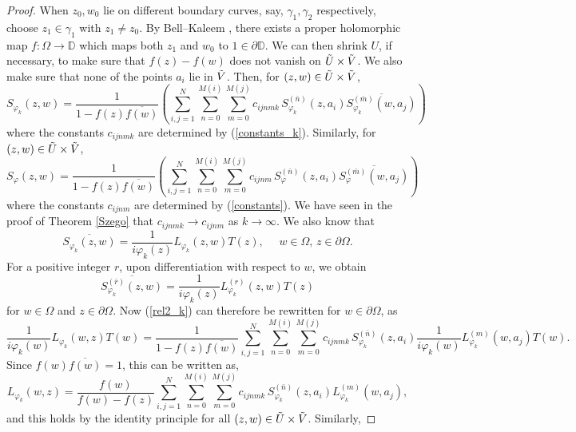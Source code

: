 \documentclass[11pt, reqno]{amsart}
\numberwithin{equation}{section}
\newcommand{\ra}{\rightarrow}
\newcommand{\Om}{\Omega}
\begin{document}
\begin{proof}
        When $z_0,w_0$ lie on different boundary curves, say, $\gamma_1, \gamma_2$ respectively, choose $z_1\in \gamma_1$ with $z_1\neq z_0$. By Bell--Kaleem \cite{BeKf}, there exists a proper holomorphic map $f: \Omega \ra \mathbb D$ which maps both $z_1$ and $w_0$ to $1 \in \partial \mathbb D$. We can then shrink $U$, if necessary, to make sure that $f(z)-f(w)$ does not vanish on $\Tilde{U}\times\Tilde{V}$. We also make sure that none of the points $a_i$ lie in $\Tilde{V}$. Then, for $(z,w)\in \Tilde{U}\times \Tilde{V}$, 
		\begin{equation}\label{rel2_k}
			S_{\varphi_k}(z,w) = \frac{1}{1-f(z)\overline{f(w)}} \left(\sum_{i,j=1}^N \sum_{n=0}^{M(i)} \sum_{m=0}^{M(j)} c_{ijnmk}\, S_{\varphi_k}^{(\bar{n})}(z,a_i) \overline{S_{\varphi_k}^{(\bar{m})}(w,a_j)}\right)
		\end{equation}
        where the constants $c_{ijnmk}$ are determined by (\ref{constants_k}). Similarly, for $(z,w)\in \Tilde{U}\times \Tilde{V}$, 
		\begin{equation}\label{rel2}
			S_{\varphi}(z,w) = \frac{1}{1-f(z)\overline{f(w)}} \left(\sum_{i,j=1}^N \sum_{n=0}^{M(i)} \sum_{m=0}^{M(j)} c_{ijnm}\, S_{\varphi}^{(\bar{n})}(z,a_i) \overline{S_{\varphi}^{(\bar{m})}(w,a_j)}\right)
		\end{equation}
        where the constants $c_{ijnm}$ are determined by (\ref{constants}).
        We have seen in the proof of Theorem \ref{Szego} that $c_{ijnmk}\rightarrow c_{ijnm}$ as $k\rightarrow\infty$. We also know that
	\[
	\overline{S_{\varphi_k}(z,w)} = \frac{1}{i\varphi_k(z)}L_{\varphi_k}(z,w)T(z),
	\quad\,\,
	w\in\Om, \,z\in\partial\Omega.
	\]
For a positive integer $r$, upon differentiation with respect to $w$, we obtain
\[
\overline{S_{\varphi_k}^{(\bar{r})}(z,w)} = \frac{1}{i\varphi_k(z)}L_{\varphi_k}^{(r)}(z,w)T(z)
\]
for $w\in\Om$ and $z\in\partial\Omega$. Now (\ref{rel2_k}) can therefore be rewritten for $w\in\partial\Om$, as
\[
\frac{1}{i\varphi_k(w)}L_{\varphi_k}(w,z)T(w) 
=
\frac{1}{1-f(z)\overline{f(w)}} \sum_{i,j=1}^N \sum_{n=0}^{M(i)} \sum_{m=0}^{M(j)} c_{ijnmk}\, S_{\varphi_k}^{(\bar{n})}(z,a_i)
\frac{1}{i\varphi_k(w)} L_{\varphi_k}^{(m)}(w,a_j) T(w).
\]
Since $f(w) \overline{f(w)} = 1$, this can be written as,
\begin{equation}
L_{\varphi_k}(w,z) 
=
\frac{f(w)}{f(w)-f(z)} \sum_{i,j=1}^N \sum_{n=0}^{M(i)} \sum_{m=0}^{M(j)} c_{ijnmk}\, S_{\varphi_k}^{(\bar{n})}(z,a_i)
L_{\varphi_k}^{(m)}(w,a_j), 
\end{equation}
and this holds by the identity principle for all $(z,w)\in \Tilde{U}\times\Tilde{V}$. Similarly,

\end{proof}
\end{document}
